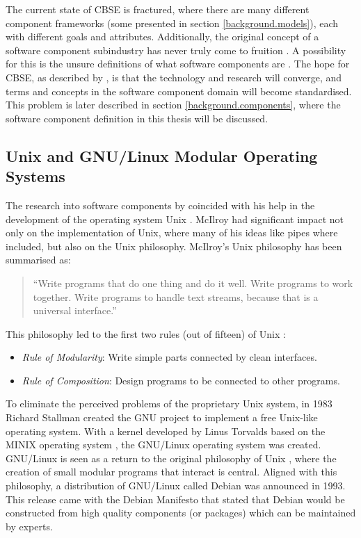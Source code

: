 The current state of CBSE is fractured, where there are many different component frameworks (some presented in section \ref{background.models}),
each with different goals and attributes.
Additionally, the original concept of a software component subindustry has never truly come to fruition \citep{Szyperski2002}.
A possibility for this is the unsure definitions of what software components are \citep{Crnkovic2011}.
The hope for CBSE, as described by \cite{Crnkovic2011}, is that the technology and research will converge, and terms and concepts in the software component domain will become standardised.
This problem is later described in section \ref{background.components}, where the software component definition in this thesis will be discussed.

\subsection{Unix and GNU/Linux Modular Operating Systems}
The research into software components by \cite{McIlroy1969} coincided with his help in the development of the operating system Unix \citep{raymond2003art}. 
McIlroy had significant impact not only on the implementation of Unix, where many of his ideas like pipes where included,
but also on the Unix philosophy. 
McIlroy's Unix philosophy has been summarised as:
\begin{quote}
``Write programs that do one thing and do it well. Write programs to work together. 
Write programs to handle text streams, because that is a universal interface.'' \citep{Salus1994}
\end{quote}

This philosophy led to the first two rules (out of fifteen) of Unix \citep{raymond2003art}:
\begin{itemize}
  \item \textit{Rule of Modularity}: Write simple parts connected by clean interfaces.
  \item \textit{Rule of Composition}: Design programs to be connected to other programs.
\end{itemize} 

To eliminate the perceived problems of the proprietary Unix system, in 1983 Richard Stallman created the GNU project \citep{stallman1985gnu} to implement a free Unix-like operating system.
With a kernel developed by Linus Torvalds based on the MINIX operating system \citep{tanenbaum1989minix}, the GNU/Linux operating system \citep{torvalds2002just} was created.
GNU/Linux is seen as a return to the original philosophy of Unix \citep{Gancarz2003}, where the creation of small modular programs that interact is central.
Aligned with this philosophy, a distribution of GNU/Linux called Debian \citep{Barth2005} was announced in 1993.
This release came with the Debian Manifesto \citep{murdock1994brief} 
that stated that Debian would be constructed from high quality components (or packages) which can be maintained by experts.

